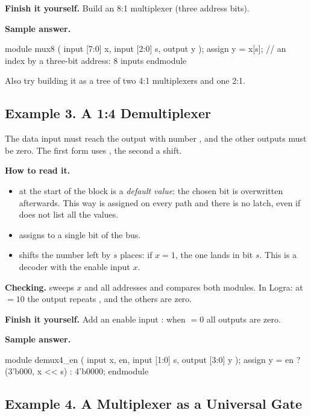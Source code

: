 \textbf{Finish it yourself.} Build an 8:1 multiplexer (three address bits).

\textbf{Sample answer.}
\begin{vcode}
module mux8 (
    input  [7:0] x,
    input  [2:0] s,
    output       y
);
    assign y = x[s];     // an index by a three-bit address: 8 inputs
endmodule
\end{vcode}
Also try building it as a tree of two 4:1 multiplexers and one 2:1.

\subsection{Example 3. A 1:4 Demultiplexer}

The data input  must reach the output with number , and the other
outputs must be zero. The first form uses , the second a shift.


\textbf{How to read it.}
\begin{itemize}
  \item {} at the start of the block is a \emph{default value}: the chosen bit is overwritten afterwards. This way  is assigned on every path and there is no latch, even if  does not list all the values.
  \item {} assigns to a single bit of the bus.
  \item {} shifts the number  left by $s$ places: if $x=1$, the one lands in bit $s$. This is a decoder with the enable input $x$.
\end{itemize}
\textbf{Checking.}  sweeps $x$ and all addresses and compares
both modules. In Logra: at  $=10$ the output  repeats
, and the others are zero.

\textbf{Finish it yourself.} Add an enable input : when  $=0$
all outputs are zero.

\textbf{Sample answer.}
\begin{vcode}
module demux4_en (
    input        x, en,
    input  [1:0] s,
    output [3:0] y
);
    assign y = en ? ({3'b000, x} << s) : 4'b0000;
endmodule
\end{vcode}

\subsection{Example 4. A Multiplexer as a Universal Gate}

